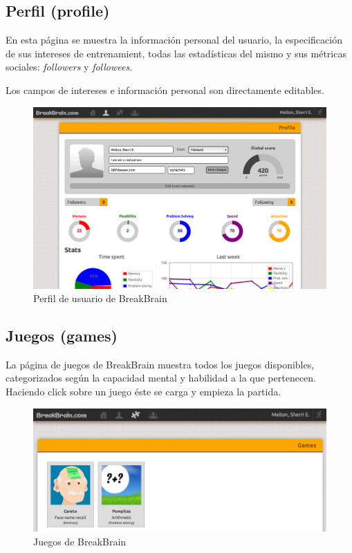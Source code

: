 \subsection{Perfil (profile)}

En esta página se muestra la información personal del usuario, la especificación de sus intereses de entrenamient, todas las estadísticas del mismo y sus métricas sociales: {\it followers} y {\it followees}.

Los campos de intereses e información personal son directamente editables.

\begin{figure}[h]
  \begin{center}
    \includegraphics[width=\textwidth]{./images/page-profile.png}
  \end{center}  
  \caption{Perfil de usuario de BreakBrain}
  \label{fig::page-profile}
\end{figure}

\subsection{Juegos (games)}

La página de juegos de BreakBrain muestra todos los juegos disponibles, categorizados según la capacidad mental y habilidad a la que pertenecen. Haciendo click sobre un juego éste se carga y empieza la partida.

\begin{figure}[h]
  \begin{center}
    \includegraphics[width=\textwidth]{./images/page-games.png}
  \end{center}  
  \caption{Juegos de BreakBrain}
  \label{fig::page-games}
\end{figure}

